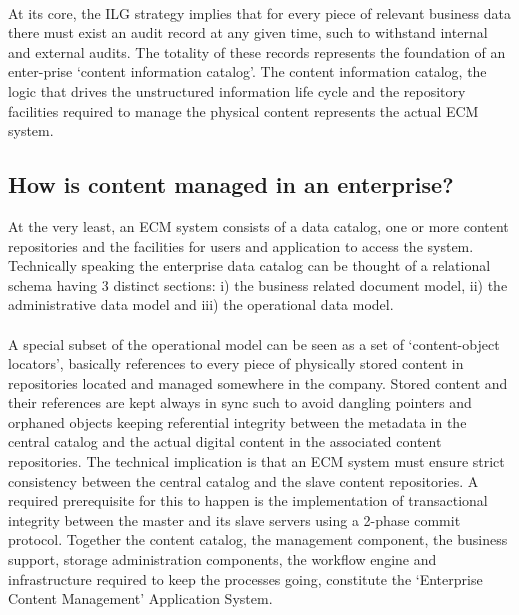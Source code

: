 \documentclass[EPiC]{easychair} %
\begin{document}
\paragraph{}  At its core, the ILG strategy implies that for every piece of relevant business data there must exist an audit record at any given time, such to withstand internal and external audits. The totality of these records represents the foundation of an enter-prise ‘content information catalog’. The content information catalog, the logic that drives the unstructured information life cycle and the repository facilities required to manage the physical content represents the actual ECM system.

\subsection{ How is content managed in an enterprise? }
At the very least, an ECM system consists of a data catalog, one or more content repositories and the facilities for users and application to access the system. Technically speaking the enterprise data catalog can be thought of a relational schema having 3 distinct sections: i) the business related document model, ii) the administrative data model and iii) the operational data model. 

\paragraph{} A special subset of the operational model can be seen as a set of ‘content-object locators’, basically references to every piece of physically stored content in repositories located and managed somewhere in the company.  Stored content and their references are kept always in sync such to avoid dangling pointers and orphaned objects keeping referential integrity between the metadata in the central catalog and the actual digital content in the associated content repositories. The technical implication is that an ECM system must ensure strict consistency between the central catalog and the slave content repositories. A required prerequisite for this to happen is the implementation of transactional integrity between the master and its slave servers using a 2-phase commit protocol. Together the content catalog, the management component, the business support, storage administration components, the workflow engine and infrastructure required to keep the processes going, constitute the ‘Enterprise Content Management’ Application System.
\end{document}

